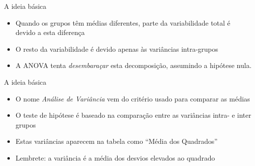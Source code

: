 \documentclass{beamer}
\begin{document}
\begin{frame}{A ideia básica}
  \begin{itemize}
  \item Quando os grupos têm médias diferentes, parte da variabilidade total é devido a esta diferença
  \item O resto da variabilidade é devido apenas às variâncias intra-grupos
  \item A ANOVA tenta {\em desembaraçar} esta decomposição, assumindo a hipótese nula.
  \end{itemize}
\end{frame}

\begin{frame}{A ideia básica}
  \begin{itemize}
  \item O nome {\em Análise de Variância} vem do critério usado para comparar as médias
  \item O teste de hipótese é baseado na comparação entre as variâncias intra- e inter grupos
  \item Estas variâncias aparecem na tabela como ``Média dos Quadrados''
  \item Lembrete: a variância é a média dos desvios elevados ao quadrado
  \end{itemize}
\end{frame}

\end{document}
